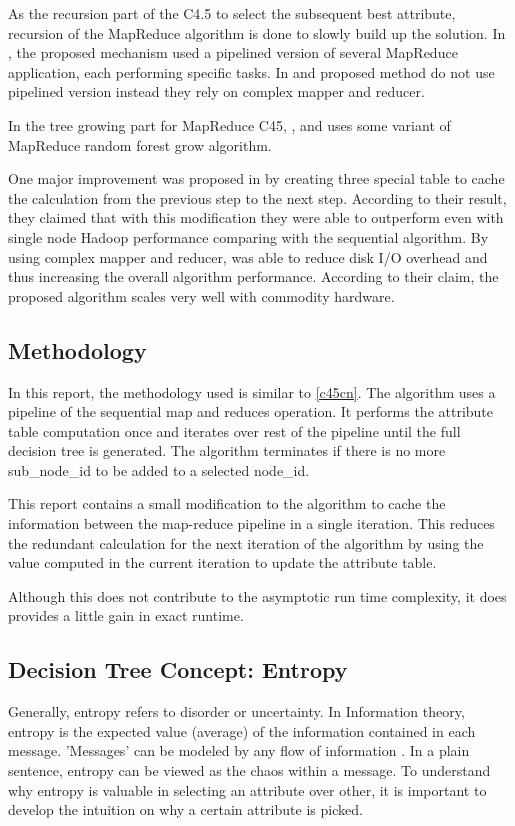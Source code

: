 \documentclass{article}
\begin{document}
\BlankLine
As the recursion part of the C4.5 to select the subsequent best attribute, recursion of the MapReduce algorithm is done to slowly build up the solution. In \cite{c45cn}, the proposed mechanism used a pipelined version of several MapReduce application, each performing specific tasks. In \cite{c452017} and \cite{c45in} proposed method do not use pipelined version instead they rely on complex mapper and reducer.

\BlankLine
In the tree growing part for MapReduce C45, \cite{c452017}, \cite{c45cn} and \cite{c45in} uses some variant of MapReduce random forest grow algorithm.

\BlankLine
One major improvement was proposed in \cite{c45cn} by creating three special table to cache the calculation from the previous step to the next step. According to their result, they claimed that with this modification they were able to outperform even with single node Hadoop performance comparing with the sequential algorithm. By using complex mapper and reducer, \cite{c452017} was able to reduce disk I/O overhead and thus increasing the overall algorithm performance. According to their claim, the proposed algorithm scales very well with commodity hardware.

\subsection{Methodology}
In this report, the methodology used is similar to \ref{c45cn}. The algorithm uses a pipeline of the sequential map and reduces operation. It performs the attribute table computation once and iterates over rest of the pipeline until the full decision tree is generated. The algorithm terminates if there is no more sub\_node\_id to be added to a selected node\_id.

This report contains a small modification to the algorithm to cache the information between the map-reduce pipeline in a single iteration. This reduces the redundant calculation for the next iteration of the algorithm by using the value computed in the current iteration to update the attribute table.

Although this does not contribute to the asymptotic run time complexity, it does provides a little gain in exact runtime.

\subsection{Decision Tree Concept: Entropy}
Generally, entropy refers to disorder or uncertainty. In Information theory, entropy is the expected value (average) of the information contained in each message. 'Messages' can be modeled by any flow of information \cite{wikientropy}. In a plain sentence, entropy can be viewed as the chaos within a message. To understand why entropy is valuable in selecting an attribute over other, it is important to develop the intuition on why a certain attribute is picked.
\end{document}
